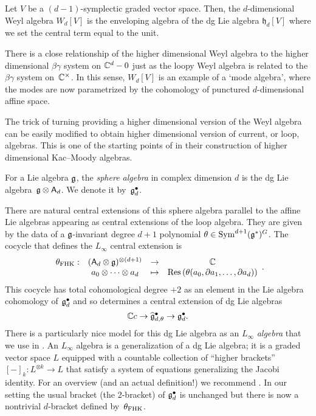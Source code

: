 \documentclass[11pt]{amsart}
\def\lie#1{\ensuremath{\mathfrak{#1}}}
\begin{document}
\begin{dfn}
Let $V$ be a $(d-1)$-symplectic graded vector space. 
Then, the $d$-dimensional Weyl algebra $W_d[V]$ is the enveloping algebra of the dg Lie algebra $\lie{h}_d [V]$ where we set the central term equal to the unit.
\end{dfn}

There is a close relationship of the higher dimensional Weyl algebra to the higher dimensional $\beta\gamma$ system on $\mathbb C^d - 0$ just as the loopy Weyl algebra is related to the $\beta\gamma$ system on~$\mathbb C^\times$.
In this sense, $W_d[V]$ is an example of a `mode algebra', where the modes are now parametrized by the cohomology of punctured $d$-dimensional affine space.

The trick of turning providing a higher dimensional version of the Weyl algebra can be easily modified to obtain higher dimensional version of current, or loop, algebras. 
This is one of the starting points of \cite{FHK} in their construction of higher dimensional Kac--Moody algebras. 

\begin{dfn}
\label{dfn:sphere}
For a Lie algebra $\mathfrak g$, the {\em sphere algebra} in complex dimension $d$ is the dg Lie algebra~$\mathfrak g \otimes \mathsf A_d$.
We denote it by~$\mathfrak g^\bullet_d$.
\end{dfn}

There are natural central extensions of this sphere algebra 
parallel to the affine Lie algebras appearing as central extensions of the loop algebra.
They are given by the data of a $\mathfrak g$-invariant degree $d+1$ polynomial $\theta \in \operatorname{Sym}^{d+1}(\mathfrak g^*)^G$.
The cocycle that defines the $L_\infty$ central extension is
\[
\label{fhk cocycle}
\begin{array}{cccc}
\theta_{\rm FHK} : & (\mathsf A_d \otimes \mathfrak g)^{\otimes (d+1)} & \to & \mathbb C\\ 
& a_0 \otimes \cdots \otimes a_d & \mapsto & {\rm Res} \left(\theta(a_0,\partial a_1,\ldots,\partial a_d)\right)
\end{array}.
\]
This cocycle has total cohomological degree $+2$ as an element in the Lie algebra cohomology of $\mathfrak g^\bullet_{d}$ and so determines a central extension of dg Lie algebras
\[
\mathbb C c \to \widehat{\mathfrak g}^\bullet_{d, \theta} \to \mathfrak g^\bullet_d .
\]
There is a particularly nice model for this dg Lie algebra as an $L_\infty$ \textit{algebra} that we use in \cite{GWkm}.
An $L_\infty$ algebra is a generalization of a dg Lie algebra;
it is a graded vector space $L$ equipped with a countable collection of ``higher brackets'' $[-]_k \colon L^{\otimes k} \to L$ that satisfy a system of equations generalizing the Jacobi identity.
For an overview (and an actual definition!) we recommend \cite{LV}.
In our setting the usual bracket (the 2-bracket) of $\mathfrak g^\bullet_d$ is unchanged but there is now a nontrivial $d$-bracket defined by~$\theta_{\rm FHK}$.
\end{document}
